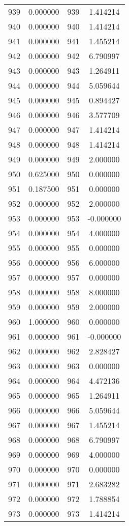 \documentclass[12pt]{article}
\begin{document}
\begin{longtable}{@{}cccc@{}}
939 & 0.000000 & 939 & 1.414214 \\
940 & 0.000000 & 940 & 1.414214 \\
941 & 0.000000 & 941 & 1.455214 \\
942 & 0.000000 & 942 & 6.790997 \\
943 & 0.000000 & 943 & 1.264911 \\
944 & 0.000000 & 944 & 5.059644 \\
945 & 0.000000 & 945 & 0.894427 \\
946 & 0.000000 & 946 & 3.577709 \\
947 & 0.000000 & 947 & 1.414214 \\
948 & 0.000000 & 948 & 1.414214 \\
949 & 0.000000 & 949 & 2.000000 \\
950 & 0.625000 & 950 & 0.000000 \\
951 & 0.187500 & 951 & 0.000000 \\
952 & 0.000000 & 952 & 2.000000 \\
953 & 0.000000 & 953 & -0.000000 \\
954 & 0.000000 & 954 & 4.000000 \\
955 & 0.000000 & 955 & 0.000000 \\
956 & 0.000000 & 956 & 6.000000 \\
957 & 0.000000 & 957 & 0.000000 \\
958 & 0.000000 & 958 & 8.000000 \\
959 & 0.000000 & 959 & 2.000000 \\
960 & 1.000000 & 960 & 0.000000 \\
961 & 0.000000 & 961 & -0.000000 \\
962 & 0.000000 & 962 & 2.828427 \\
963 & 0.000000 & 963 & 0.000000 \\
964 & 0.000000 & 964 & 4.472136 \\
965 & 0.000000 & 965 & 1.264911 \\
966 & 0.000000 & 966 & 5.059644 \\
967 & 0.000000 & 967 & 1.455214 \\
968 & 0.000000 & 968 & 6.790997 \\
969 & 0.000000 & 969 & 4.000000 \\
970 & 0.000000 & 970 & 0.000000 \\
971 & 0.000000 & 971 & 2.683282 \\
972 & 0.000000 & 972 & 1.788854 \\
973 & 0.000000 & 973 & 1.414214 \\

\end{longtable}
\end{document}
